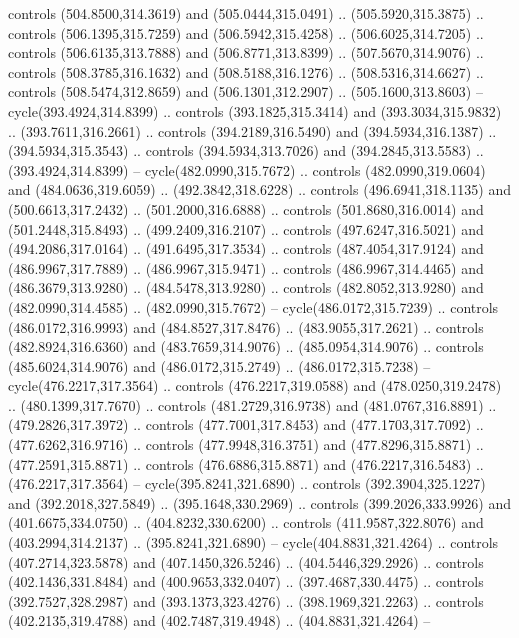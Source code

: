 \begin{scope}[cm={{1.25,0.0,0.0,-1.25,(0.0,743.43331)}}]
    controls (504.8500,314.3619) and (505.0444,315.0491) .. (505.5920,315.3875) ..
    controls (506.1395,315.7259) and (506.5942,315.4258) .. (506.6025,314.7205) ..
    controls (506.6135,313.7888) and (506.8771,313.8399) .. (507.5670,314.9076) ..
    controls (508.3785,316.1632) and (508.5188,316.1276) .. (508.5316,314.6627) ..
    controls (508.5474,312.8659) and (506.1301,312.2907) .. (505.1600,313.8603) --
    cycle(393.4924,314.8399) .. controls (393.1825,315.3414) and
    (393.3034,315.9832) .. (393.7611,316.2661) .. controls (394.2189,316.5490) and
    (394.5934,316.1387) .. (394.5934,315.3543) .. controls (394.5934,313.7026) and
    (394.2845,313.5583) .. (393.4924,314.8399) -- cycle(482.0990,315.7672) ..
    controls (482.0990,319.0604) and (484.0636,319.6059) .. (492.3842,318.6228) ..
    controls (496.6941,318.1135) and (500.6613,317.2432) .. (501.2000,316.6888) ..
    controls (501.8680,316.0014) and (501.2448,315.8493) .. (499.2409,316.2107) ..
    controls (497.6247,316.5021) and (494.2086,317.0164) .. (491.6495,317.3534) ..
    controls (487.4054,317.9124) and (486.9967,317.7889) .. (486.9967,315.9471) ..
    controls (486.9967,314.4465) and (486.3679,313.9280) .. (484.5478,313.9280) ..
    controls (482.8052,313.9280) and (482.0990,314.4585) .. (482.0990,315.7672) --
    cycle(486.0172,315.7239) .. controls (486.0172,316.9993) and
    (484.8527,317.8476) .. (483.9055,317.2621) .. controls (482.8924,316.6360) and
    (483.7659,314.9076) .. (485.0954,314.9076) .. controls (485.6024,314.9076) and
    (486.0172,315.2749) .. (486.0172,315.7238) -- cycle(476.2217,317.3564) ..
    controls (476.2217,319.0588) and (478.0250,319.2478) .. (480.1399,317.7670) ..
    controls (481.2729,316.9738) and (481.0767,316.8891) .. (479.2826,317.3972) ..
    controls (477.7001,317.8453) and (477.1703,317.7092) .. (477.6262,316.9716) ..
    controls (477.9948,316.3751) and (477.8296,315.8871) .. (477.2591,315.8871) ..
    controls (476.6886,315.8871) and (476.2217,316.5483) .. (476.2217,317.3564) --
    cycle(395.8241,321.6890) .. controls (392.3904,325.1227) and
    (392.2018,327.5849) .. (395.1648,330.2969) .. controls (399.2026,333.9926) and
    (401.6675,334.0750) .. (404.8232,330.6200) .. controls (411.9587,322.8076) and
    (403.2994,314.2137) .. (395.8241,321.6890) -- cycle(404.8831,321.4264) ..
    controls (407.2714,323.5878) and (407.1450,326.5246) .. (404.5446,329.2926) ..
    controls (402.1436,331.8484) and (400.9653,332.0407) .. (397.4687,330.4475) ..
    controls (392.7527,328.2987) and (393.1373,323.4276) .. (398.1969,321.2263) ..
    controls (402.2135,319.4788) and (402.7487,319.4948) .. (404.8831,321.4264) --

\end{scope}
